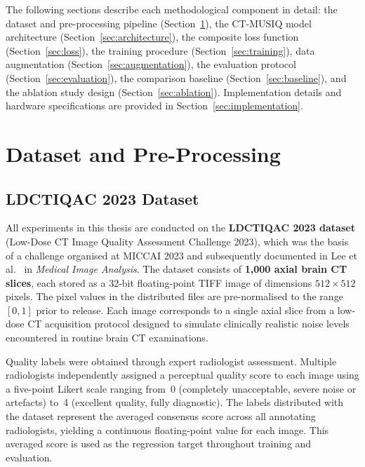 The following sections describe each methodological component in detail: the dataset and
pre-processing pipeline (Section~\ref{sec:dataset}), the CT-MUSIQ model architecture
(Section~\ref{sec:architecture}), the composite loss function
(Section~\ref{sec:loss}), the training procedure (Section~\ref{sec:training}), data
augmentation (Section~\ref{sec:augmentation}), the evaluation protocol
(Section~\ref{sec:evaluation}), the comparison baseline (Section~\ref{sec:baseline}),
and the ablation study design (Section~\ref{sec:ablation}). Implementation details and
hardware specifications are provided in Section~\ref{sec:implementation}.


\section{Dataset and Pre-Processing}
\label{sec:dataset}

\subsection{LDCTIQAC 2023 Dataset}

All experiments in this thesis are conducted on the \textbf{LDCTIQAC 2023 dataset}
(Low-Dose CT Image Quality Assessment Challenge 2023), which was the basis of a
challenge organised at MICCAI 2023 and subsequently documented in Lee et al.\
\cite{lee2025ldctiqac} in \textit{Medical Image Analysis}. The dataset consists of
\textbf{1,000 axial brain CT slices}, each stored as a 32-bit floating-point TIFF image
of dimensions $512 \times 512$ pixels. The pixel values in the distributed files are
pre-normalised to the range $[0, 1]$ prior to release. Each image corresponds to a
single axial slice from a low-dose CT acquisition protocol designed to simulate
clinically realistic noise levels encountered in routine brain CT examinations.

Quality labels were obtained through expert radiologist assessment. Multiple radiologists
independently assigned a perceptual quality score to each image using a five-point
Likert scale ranging from~0 (completely unacceptable, severe noise or artefacts) to~4
(excellent quality, fully diagnostic). The labels distributed with the dataset represent
the averaged consensus score across all annotating radiologists, yielding a continuous
floating-point value for each image. This averaged score is used as the regression
target throughout training and evaluation.

